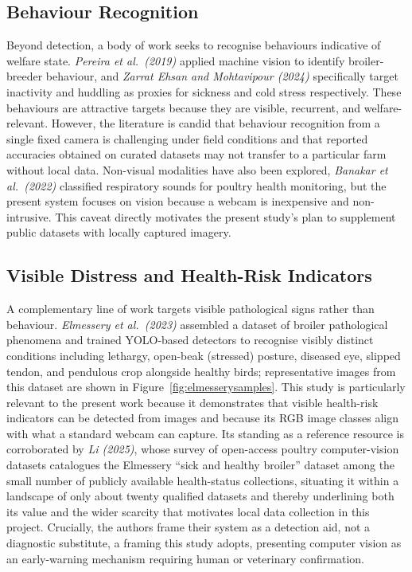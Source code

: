 \documentclass[12pt,a4paper]{report}
\begin{document}
\subsection{Behaviour Recognition}

Beyond detection, a body of work seeks to recognise behaviours indicative of welfare state. \textit{Pereira et al.\ (2019)} applied machine vision to identify broiler-breeder behaviour, and \textit{Zarrat Ehsan and Mohtavipour (2024)} specifically target inactivity and huddling as proxies for sickness and cold stress respectively. These behaviours are attractive targets because they are visible, recurrent, and welfare-relevant. However, the literature is candid that behaviour recognition from a single fixed camera is challenging under field conditions and that reported accuracies obtained on curated datasets may not transfer to a particular farm without local data. Non-visual modalities have also been explored, \textit{Banakar et al.\ (2022)} classified respiratory sounds for poultry health monitoring, but the present system focuses on vision because a webcam is inexpensive and non-intrusive. This caveat directly motivates the present study's plan to supplement public datasets with locally captured imagery.

\subsection{Visible Distress and Health-Risk Indicators}

A complementary line of work targets visible pathological signs rather than behaviour. \textit{Elmessery et al.\ (2023)} assembled a dataset of broiler pathological phenomena and trained YOLO-based detectors to recognise visibly distinct conditions including lethargy, open-beak (stressed) posture, diseased eye, slipped tendon, and pendulous crop alongside healthy birds; representative images from this dataset are shown in Figure~\ref{fig:elmesserysamples}. This study is particularly relevant to the present work because it demonstrates that visible health-risk indicators can be detected from images and because its RGB image classes align with what a standard webcam can capture. Its standing as a reference resource is corroborated by \textit{Li (2025)}, whose survey of open-access poultry computer-vision datasets catalogues the Elmessery ``sick and healthy broiler'' dataset among the small number of publicly available health-status collections, situating it within a landscape of only about twenty qualified datasets and thereby underlining both its value and the wider scarcity that motivates local data collection in this project. Crucially, the authors frame their system as a detection aid, not a diagnostic substitute, a framing this study adopts, presenting computer vision as an early-warning mechanism requiring human or veterinary confirmation.
\end{document}
